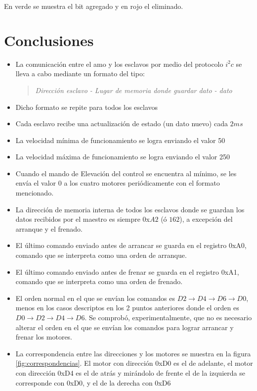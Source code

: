 \documentclass[main]{subfiles}
\begin{document}
En verde se muestra el bit agregado y en rojo el eliminado.

\section{Conclusiones}
\label{sec:conclu}

\begin{itemize}
\item La comunicaci\'on entre el amo y los esclavos por medio del protocolo $i^2c$ se lleva a cabo mediante un  formato del tipo:
\begin{quote}\textit{Direcci\'on esclavo - Lugar de memoria donde guardar dato - dato}\end{quote}
\item Dicho formato se repite para todos los esclavos
\item Cada esclavo recibe una actualizaci\'on de estado (un dato nuevo) cada $2 ms$
\item La velocidad m\'inima de funcionamiento se logra enviando el valor 50
\item La velocidad m\'axima de funcionamiento se logra enviando el valor 250
\item Cuando el mando de Elevaci\'on del control se encuentra al m\'inimo, se les env\'ia el valor 0 a los cuatro motores peri\'odicamente con el formato mencionado.
\item La direcci\'on de memoria interna de todos los esclavos donde se guardan los datos recibidos por el maestro es siempre 0x$A2$ (\'o $162$), a excepci\'on del arranque y el frenado.
\item El \'ultimo comando enviado antes de arrancar se guarda en el registro 0xA0, comando que se interpreta como una orden de arranque.
\item El \'ultimo comando enviado antes de frenar se guarda en el registro 0xA1, comando que se interpreta como una orden de frenado.
\item El orden normal en el que se env\'ian los comandos es $D2\rightarrow D4\rightarrow D6\rightarrow D0$, menos en los casos descriptos en los 2 puntos anteriores donde el orden es $D0\rightarrow D2\rightarrow D4\rightarrow D6$. Se comprobó, experimentalmente, que no es necesario alterar el orden en el que se env\'ian los comandos para lograr arrancar y frenar los motores.
\item La correspondencia entre las direcciones y los motores se muestra en la figura \ref{fig:correspondencias}. El motor con direcci\'on 0xD0 es el de adelante, el motor con direcci\'on 0xD4 es el de atr\'as y mir\'andolo de frente el de la izquierda se corresponde con 0xD0, y el de la derecha con 0xD6

\end{itemize}
\end{document}
